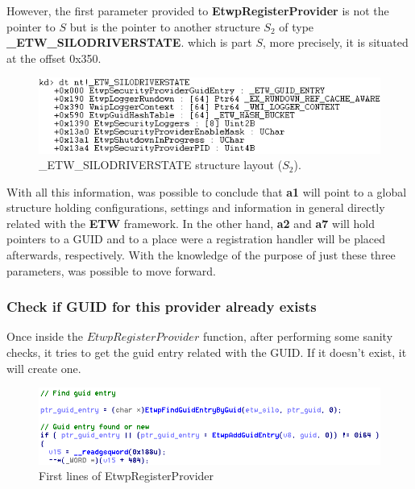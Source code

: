   However, the first parameter provided to {\bfseries EtwpRegisterProvider} is not the pointer to $S$ but is the pointer to another structure $S_2$ of type {\bfseries \_ETW\_SILODRIVERSTATE}. which is part $S$, more precisely, it is situated at the offset 0x350. 

  \begin{centering}
  \begin{figure}[H]
    \includegraphics[width=12cm]{images/ETW_SILODRIVERSTATE_structure.png}
    \caption[]{\_ETW\_SILODRIVERSTATE structure layout ($S_2$).}
    \label{fig:etwsilodriverstate_structure}
  \end{figure}
  \end{centering}

  With all this information, was possible to conclude that {\bfseries a1} will point to a global structure holding configurations, settings and information in general directly related with the {\bfseries ETW} framework. In the other hand, {\bfseries a2} and {\bfseries a7} will hold pointers to a GUID and to a place were a registration handler will be placed afterwards, respectively. 
  With the knowledge of the purpose of just these three parameters, was possible to move forward.


  \subsubsection{Check if GUID for this provider already exists}
  Once inside the $EtwpRegisterProvider$ function, after performing some sanity checks, it tries to get the guid entry related with the GUID. If it doesn't exist, it will create one. 
  
  \begin{centering}
  \begin{figure}[H]
    \includegraphics[width=15cm]{images/etwpregisterProvider.png}
    \caption[]{First lines of EtwpRegisterProvider}
    \label{fig:etwpregisterProvider}
  \end{figure}
  \end{centering}

